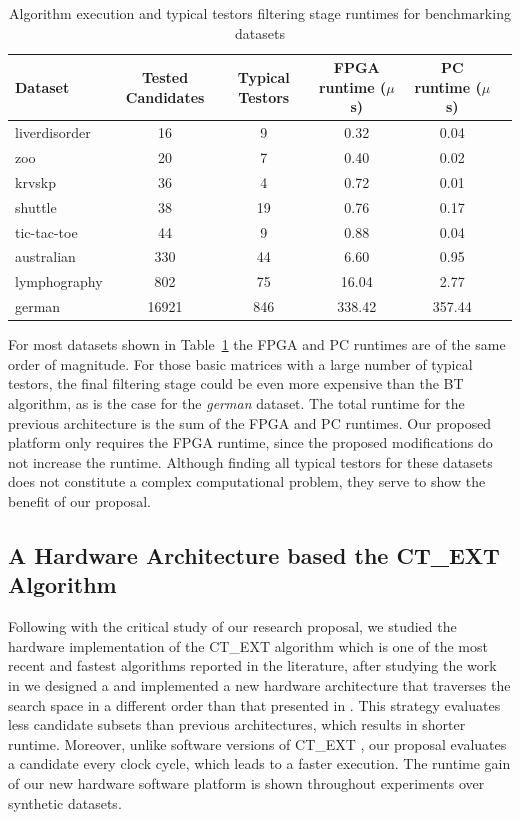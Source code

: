 \documentclass[authoryear,11pt]{elsarticle}
\begin{document}
	\begin{table}[htb]
	\caption{Algorithm execution and typical testors filtering stage runtimes for benchmarking datasets}
	\label{tabTimes}
	\centering
	\begin{tabular}{lccccc}
	 	\hline                       
	  	Dataset & Tested Candidates & Typical Testors & FPGA runtime ($ \mu $s) & PC runtime ($ \mu $s)\\
	  	\hline
	  	liverdisorder& 16   & 9    & 0.32  & 0.04 \\
	  	zoo          & 20   & 7    & 0.40  & 0.02 \\
	  	krvskp       & 36   & 4    & 0.72  & 0.01 \\	  	
	  	shuttle      & 38   & 19   & 0.76  & 0.17 \\
	  	tic-tac-toe  & 44   & 9    & 0.88  & 0.04 \\
	  	australian   & 330  & 44   & 6.60  & 0.95 \\
	  	lymphography & 802  & 75   & 16.04 & 2.77 \\
	  	german       & 16921& 846  & 338.42& 357.44 \\
	 	\hline 
	\end{tabular}
	\end{table}
	
	For most datasets shown in Table~\ref{tabTimes} the FPGA and PC runtimes are 
	of the same order of magnitude. For those basic matrices with a large number of typical testors, the final 
	filtering stage could be  even more expensive than the BT algorithm, as is the case for the \textit{german}
	dataset. The total runtime for the previous architecture is the sum of the FPGA and PC runtimes. Our proposed
	platform only requires the FPGA runtime, since the proposed modifications do not increase the runtime.
	Although finding all typical testors for these datasets does not constitute a complex 
	computational problem, they serve to show the benefit of our proposal.

\subsection{A Hardware Architecture based the CT\_EXT Algorithm}\label{CTH}
	Following with the critical study of our research proposal, we studied the hardware implementation of the 
	CT\_EXT algorithm which is one of the most recent and fastest algorithms reported in the literature, after
	studying the work in \citep{Rojas12} we designed a and implemented a new hardware architecture that traverses
	the search space in a different order than that presented in \citep{Rojas07, Rojas12,Rodriguez14}.
	This strategy evaluates less
	candidate subsets than previous architectures, which results in shorter runtime. Moreover, unlike 
	software versions of CT\_EXT \citep{Sanchez07, Sanchez10}, our proposal evaluates a candidate every clock 
	cycle, which leads to a faster execution. The runtime gain of our new hardware software platform is
	shown throughout	experiments over synthetic datasets.
	
\end{document}
